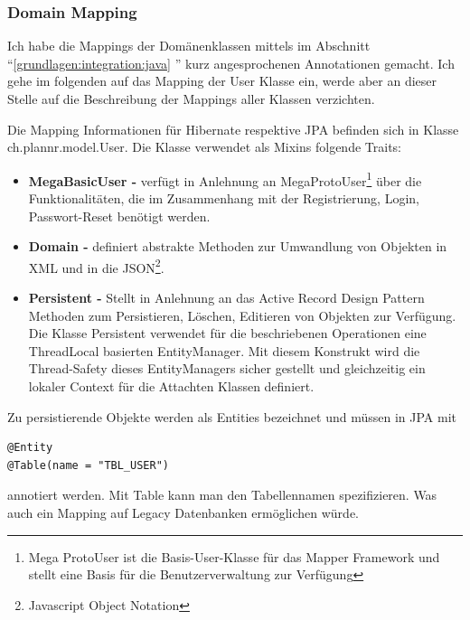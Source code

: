 \subsubsection{Domain Mapping}
Ich habe die Mappings der Dom\"anenklassen mittels im Abschnitt ``\ref{grundlagen:integration:java} '' kurz angesprochenen Annotationen gemacht. Ich gehe im folgenden auf das Mapping der User Klasse ein, werde aber an dieser Stelle auf die Beschreibung der Mappings aller Klassen verzichten. 

Die Mapping Informationen f\"ur Hibernate respektive JPA befinden sich in Klasse ch.plannr.model.User. Die Klasse verwendet als Mixins folgende Traits:
\begin{itemize}
	\item \textbf{MegaBasicUser - } verf\"ugt in Anlehnung an MegaProtoUser\footnote{Mega ProtoUser ist die Basis-User-Klasse f\"ur das Mapper Framework und stellt eine Basis f\"ur die Benutzerverwaltung zur Verf\"ugung} \"uber die Funktionalit\"aten, die im Zusammenhang mit der Registrierung, Login, Passwort-Reset ben\"otigt werden. 
	\item \textbf{Domain -} definiert abstrakte Methoden zur Umwandlung von Objekten in XML und in die JSON\footnote{Javascript Object Notation}. 
	\item \textbf{Persistent - }Stellt in Anlehnung an das Active Record Design Pattern Methoden zum Persistieren, L\"oschen, Editieren von Objekten zur Verf\"ugung. Die Klasse Persistent verwendet f\"ur die beschriebenen Operationen eine ThreadLocal basierten EntityManager. Mit diesem Konstrukt wird die Thread-Safety dieses EntityManagers sicher gestellt und gleichzeitig ein lokaler Context f\"ur die Attachten Klassen definiert.	
\end{itemize}

Zu persistierende Objekte werden als Entities bezeichnet und m\"ussen in JPA mit 
\begin{lstlisting}[caption=User: ScalaJPA Entity Definiton]
@Entity
@Table(name = "TBL_USER")
\end{lstlisting}

annotiert werden. Mit Table kann man den Tabellennamen spezifizieren. Was auch ein Mapping auf Legacy Datenbanken erm\"oglichen w\"urde.

